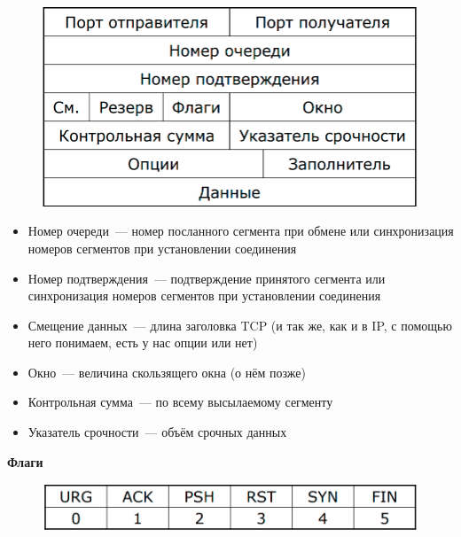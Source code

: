 \begin{figure}[H]
  \centering
  \includegraphics[width=15cm]{images/03/04}
\end{figure}

\begin{itemize}
    \item Номер очереди~--- номер посланного сегмента при обмене или синхронизация номеров сегментов при установлении соединения
    \item Номер подтверждения~--- подтверждение принятого сегмента или синхронизация номеров сегментов при установлении соединения
    \item Смещение данных~--- длина заголовка TCP (и так же, как и в IP, с помощью него понимаем, есть у нас опции или нет)
    \item Окно~--- величина скользящего окна (о нём позже)
    \item Контрольная сумма~--- по всему высылаемому сегменту
    \item Указатель срочности~--- объём срочных данных

\end{itemize}

{\bf Флаги}

\begin{figure}[H]
  \centering
  \includegraphics[width=15cm]{images/03/05}
\end{figure}

